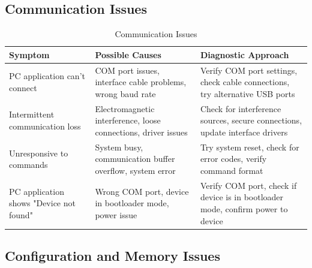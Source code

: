 \documentclass[12pt,a4paper,twoside,openright]{book}
\newcommand{\tabletextfont}{\normalfont\rmfamily}
\newcommand{\tableheadfont}{\normalfont\bfseries}
\begin{document}
\subsection{Communication Issues}

\begin{table}[h]
\centering
\setlength{\tabcolsep}{5pt} %
\begin{tabular}{|p{}|p{}|p{}|}
\hline
\tableheadfont\textbf{Symptom} & \tableheadfont\textbf{Possible Causes} & \tableheadfont\textbf{Diagnostic Approach} \\
\hline
\tabletextfont PC application can't connect & COM port issues, interface cable problems, wrong baud rate & Verify COM port settings, check cable connections, try alternative USB ports \\
\hline
\tabletextfont Intermittent communication loss & Electromagnetic interference, loose connections, driver issues & Check for interference sources, secure connections, update interface drivers \\
\hline
\tabletextfont Unresponsive to commands & System busy, communication buffer overflow, system error & Try system reset, check for error codes, verify command format \\
\hline
\tabletextfont PC application shows "Device not found" & Wrong COM port, device in bootloader mode, power issue & Verify COM port, check if device is in bootloader mode, confirm power to device \\
\hline
\end{tabular}
\caption{Communication Issues}
\end{table}

\subsection{Configuration and Memory Issues}
\end{document}
